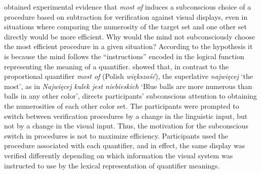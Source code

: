 \documentclass[output=paper]{langscibook}
\begin{document}
\citet{pietroski2009meaning, bates2015parsimonious, tomaszewicz2011verification, tomaszewicz2012semantics, tomaszewicz2013linguistic, tomaszewicz2018focus, hunter2017verification, Knowlton2021} obtained experimental evidence that \textit{most of} induces a subconscious choice of a procedure based on subtraction for
verification against visual displays, even in situations where comparing the numerosity of the target set and one other
set directly would be more efficient. Why would the mind not subconsciously choose the most efficient procedure in a
given situation? According to the hypothesis it is because the mind follows the “instructions” encoded in the logical
function representing the meaning of a quantifier. \citet{tomaszewicz2011verification, tomaszewicz2012semantics, tomaszewicz2013linguistic, tomaszewicz2018focus} showed that, in contrast to the proportional quantifier \textit{most of} (Polish \textit{większość}), the superlative \textit{najwięcej} `the most',
as in \textit{Najwięcej kulek jest niebieskich} `Blue balls are more numerous than balls in any other color', directs
participants’ subconscious attention to obtaining the numerosities of each other color set. The participants were
prompted to switch between verification procedures by a change in the linguistic input, but not by a change in the
visual input. Thus, the motivation for the subconscious switch in procedures is not to maximize efficiency.
Participants used the procedure associated with each quantifier, and in effect, the same display was verified
differently depending on which information the visual system was instructed to use by the lexical representation of
quantifier meanings.
\end{document}
